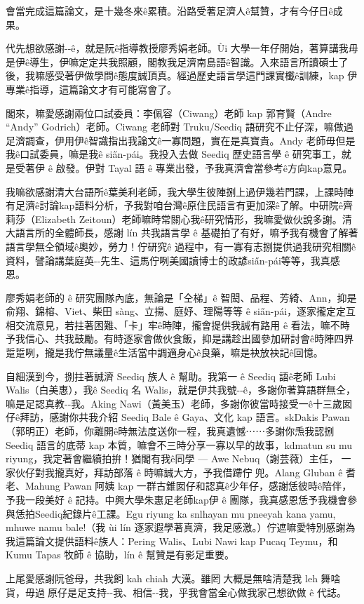 
{\CJKsansfont\sffamily

會當完成這篇論文，是十幾冬來ê累積。沿路受著足濟人ê幫贊，才有今仔日ê成果。

代先想欲感謝-{}-ê，就是阮ê指導教授廖秀娟老師。Ùi 大學一年仔開始，著算講我毋是伊ê導生，伊嘛定定共我照顧，閣教我足濟南島語ê智識。入來語言所讀碩士了後，我嘛感受著伊做學問ê態度誠頂真。經過歷史語言學這門課實櫼ê訓練，kap 伊專業ê指導，這篇論文才有可能寫會了。

閣來，嘛愛感謝兩位口試委員：李佩容（Ciwang）老師 kap 郭育賢（Andre ``Andy'' Godrich）老師。Ciwang 老師對 Truku/Seediq 語研究不止仔深，嘛做過足濟調查，伊用伊ê智識指出我論文ê一寡問題，實在是真寶貴。Andy 老師毋但是我ê口試委員，嘛是我ê sia̋n-pái。我投入去做 Seediq 歷史語言學 ê 研究事工，就是受著伊 ê 啟發。伊對 Tayal 語 ê 專業出發，予我真濟會當參考ê方向kap意見。

我嘛欲感謝清大台語所ê葉美利老師，我大學生彼陣捌上過伊幾若門課，上課時陣有足濟ê討論kap語料分析，予我對咱台灣ê原住民語言有更加深ê了解。中研院ê齊莉莎（Elizabeth Zeitoun）老師嘛時常關心我ê研究情形，我嘛愛做伙說多謝。清大語言所的全體師長，感謝 lín 共我語言學 ê 基礎拍了有好，嘛予我有機會了解著語言學無仝領域ê奧妙，勞力！佇研究ê 過程中，有一寡有志捌提供過我研究相關ê資料，譬論講葉庭英-{}-先生、這馬佇咧美國讀博士的政諺sia̋n-pái等等，我真感恩。

廖秀娟老師的 ê 研究團隊內底，無論是「仝梯」ê 智閎、品程、芳綺、Ann，抑是俞翔、錦榕、Viet、柴田 sàng、立揚、庭妤、理陽等等 ê sia̋n-pái，逐家攏定定互相交流意見，若拄著困難、「卡」牢ê時陣，攏會提供我誠有路用 ê 看法，嘛不時予我信心、共我鼓勵。有時逐家會做伙食飯，抑是講趁出國參加研討會ê時陣四界踅踅咧，攏是我佇無議量ê生活當中調適身心ê良藥，嘛是袂放袂記ê回憶。

自細漢到今，捌拄著誠濟 Seediq 族人 ê 幫助。我第一 ê Seediq 語ê老師 Lubi Walis（白美惠），我ê Seediq 名 Walis，就是伊共我號-{}-ê，多謝你著算語群無仝，嘛是足認真教-{}-我。Aking Nawi（黃美玉）老師，多謝你彼當時接受一ê十三歲囡仔ê拜訪，感謝你共我介紹 Seediq Bale ê Gaya、文化 kap 語言。skDakis Pawan（郭明正）老師，你離開ê時無法度送你一程，我真遺憾⋯⋯多謝你𤆬我認捌 Seediq 語言的底蒂 kap 本質，嘛會不三時分享一寡以早的故事，kdmatun su mu riyung，我定著會繼續拍拚！猶閣有我ê同學 --- Awe Nebuq（謝芸薇）主任，𪜶一家伙仔對我攏真好，拜訪部落 ê 時嘛誠大方，予我借蹛佇𪜶兜。Alang Gluban ê 耆老、Mahung Pawan 阿姨 kap 一群古錐囡仔和認真ê少年仔，感謝恁彼時ê陪伴，予我一段美好 ê 記持。中興大學朱惠足老師kap伊 ê 團隊，我真感恩恁予我機會參與恁拍Seediq紀錄片ê工課。Egu riyung ka snlhayan mu pneeyah kana yamu, mhuwe namu bale!（我 ùi lín 逐家遐學著真濟，我足感激。）佇遮嘛愛特別感謝為我這篇論文提供語料ê族人：Pering Walis、Lubi Nawi kap Pucaq Teymu，和Kumu Tapas 牧師 ê 協助，lín ê 幫贊是有影足重要。

上尾愛感謝阮爸母，共我飼 kah chiah 大漢。雖罔𪜶大概是無啥清楚我 leh 舞啥貨，毋過𪜶原仔是足支持-{}-我、相信-{}-我，乎我會當全心做我家己想欲做 ê 代誌。


}